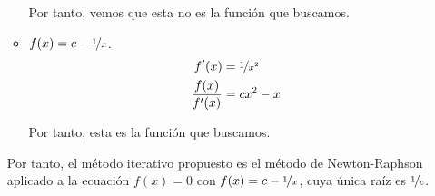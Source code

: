 \begin{ejercicio}
\begin{enumerate}
\begin{itemize}
            Por tanto, vemos que esta no es la función que buscamos.

            \item $f(x)=c-\nicefrac{1}{x}$.
            \begin{align*}
                f'(x)&=\nicefrac{1}{x^2}\\
                \dfrac{f(x)}{f'(x)}&=cx^2-x
            \end{align*}

            Por tanto, esta es la función que buscamos.
        \end{itemize}

        Por tanto, el método iterativo propuesto es el método de Newton-Raphson aplicado a la ecuación $f(x)=0$ con $f(x)=c-\nicefrac{1}{x}$, cuya única raíz es $\nicefrac{1}{c}$.
    \end{enumerate}
\end{ejercicio}


